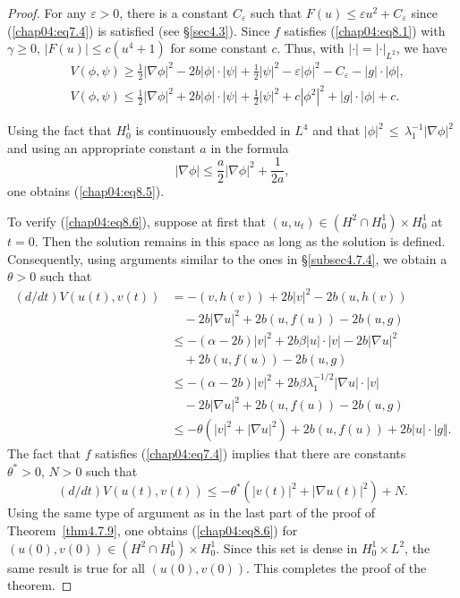 \documentclass{surv-l}
\theoremstyle{plain}
\theoremstyle{definition}
\numberwithin{equation}{section}
\numberwithin{figure}{chapter}
\begin{document}
\begin{proof} For any $\varepsilon >0$, there is a constant $C_{\varepsilon}$ such that $F(u)\leq\varepsilon u^{2}+C_{\varepsilon}$ since (\ref{chap04:eq7.4}) is satisfied (see \S \ref{sec4.3}). Since $f$ satisfies (\ref{chap04:eq8.1}) with $\gamma\geq 0,\, |F(u)|\leq c(u^{4}+1)$ for some constant $c$. Thus, with $|\cdot|=|\cdot|_{L^{2}}$, we have
\begin{align*}
&V(\phi, \psi)\geq\frac{1}{2}|\nabla\phi|^{2}-2b|\phi|\cdot |\psi|+\frac{1}{2}|\psi|^{2}-\varepsilon|\phi|^{2}-C_{\varepsilon}-|g|\cdot |\phi|,\\
&V(\phi, \psi)\leq\frac{1}{2}|\nabla\phi|^{2}+2b|\phi|\cdot |\psi|+\frac{1}{2}|\psi|^{2}+c|\phi^{2}|^{2}+|g|\cdot |\phi|+c.
\end{align*}

Using the fact that $H_{0}^{1}$ is continuously embedded in $L^{4}$ and that $|\phi|^{2}\,\leq\,\lambda_{1}^{-1}|\nabla\phi|^{2}$ and using an appropriate constant $a$ in the formula
\begin{equation*}
|\nabla\phi|\leq\frac{a}{2}|\nabla\phi|^{2}+\frac{1}{2a},
\end{equation*}
one obtains (\ref{chap04:eq8.5}).

To verify (\ref{chap04:eq8.6}), suppose at first that $(u, u_{t})\in(H^{2}\cap H_{0}^{1})\times H_{0}^{1}$ at $t=0$. Then the solution remains in this space as long as the solution is defined. Consequently, using arguments similar to the ones in \S \ref{subsec4.7.4}, we obtain a $\theta>0$ such that
\begin{align*}
(d/dt)V(u(t), v(t))&=-(v, h(v))+2b|v|^{2}-2b(u, h(v))\\
&\quad-2b|\nabla u|^{2}+2b(u, f(u))-2b(u, g)\\
&\leq-(\alpha-2b)|v|^{2}+2b\beta|u|\cdot |v|-2b|\nabla u|^{2}\\
&\quad+2b(u, f(u))-2b(u, g)\\
&\leq-(\alpha-2b)|v|^{2}+2b\beta\lambda_{1}^{-1/2}|\nabla u|\cdot |v|\\
&\quad-2b|\nabla u|^{2}+2b(u, f(u))-2b(u, g)\\
&\leq-\theta(|v|^{2}+|\nabla u|^{2})+2b(u, f(u))+2b|u|\cdot |g\Vert.
\end{align*}
The fact that $f$ satisfies (\ref{chap04:eq7.4}) implies that there are constants $\theta^{\ast}>0,\, N>0$ such that
\begin{equation*}
(d/dt)V(u(t), v(t))\leq-\theta^{\ast}(|v(t)|^{2}+|\nabla u(t)|^{2})+N.
\end{equation*}
Using the same type of argument as in the last part of the proof of Theorem~\ref{thm4.7.9}, one obtains (\ref{chap04:eq8.6}) for $(u(0), v(0))\in(H^{2}\cap H_{0}^{1})\times H_{0}^{1}$. Since this set is dense in $H_{0}^{1}\times L^{2}$, the same result is true for all $(u(0), v(0))$. This completes the proof of the theorem.
\end{proof}
\end{document}
